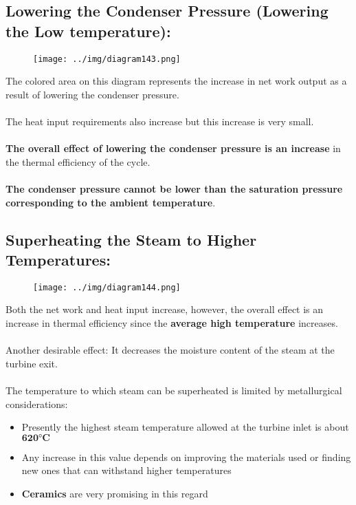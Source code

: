 \documentclass[class=report, crop=false, 12pt,a4paper]{standalone}
\numberwithin{equation}{section}
\begin{document}
\subsection*{Lowering the Condenser Pressure (Lowering the Low temperature):}
\begin{figure}[H]
  \centering
  \texttt{[image: ../img/diagram143.png]}
  \caption{}
\end{figure}
The colored area on this diagram represents the increase in net work output as a result of lowering the condenser pressure. \\\\
The heat input requirements also increase but this increase is very small. \\\\
\textbf{The overall effect of lowering the condenser pressure is an increase} in the thermal efficiency of the cycle. \\\\
\textbf{The condenser pressure cannot be lower than the saturation pressure corresponding to the ambient temperature}.
\subsection*{Superheating the Steam to Higher Temperatures:}
\begin{figure}[H]
  \centering
  \texttt{[image: ../img/diagram144.png]}
  \caption{}
\end{figure}
Both the net work and heat input increase, however, the overall effect is an increase in thermal efficiency since the \textbf{average high temperature} increases. \\\\
Another desirable effect: It decreases the moisture content of the steam at the turbine exit. \\\\
The temperature to which steam can be superheated is limited by metallurgical considerations:
\begin{itemize}[noitemsep]
  \item Presently the highest steam temperature allowed at the turbine inlet is about $\mathbf{620\si{\si\degree}C}$
  \item Any increase in this value depends on improving the materials used or finding new ones that can withstand higher temperatures
  \item \textbf{Ceramics} are very promising in this regard
\end{itemize}
\end{document}
